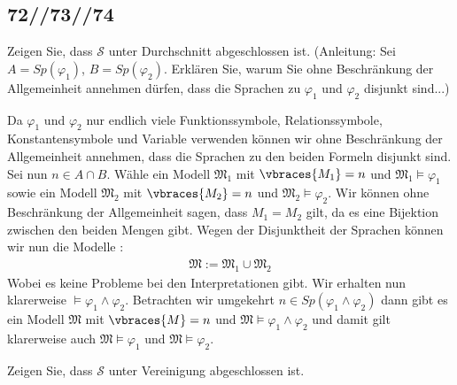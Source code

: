 \subsection*{72//73//74}

\begin{exercise}[72]

\phantom{}
	Zeigen Sie, dass $\mathscr{S}$ unter Durchschnitt abgeschlossen ist. (Anleitung: Sei $A = Sp(\varphi_1)$, $B = Sp(\varphi_2)$. Erklären Sie, warum Sie ohne Beschränkung der Allgemeinheit annehmen dürfen, dass die Sprachen zu $\varphi_1$ und $\varphi_2$ disjunkt sind...)

\end{exercise}


\begin{solution}

\phantom{}
	Da $\varphi_1$ und $\varphi_2$ nur endlich viele Funktionssymbole, Relationssymbole, Konstantensymbole und Variable verwenden können wir ohne Beschränkung der Allgemeinheit annehmen, dass die Sprachen zu den beiden Formeln disjunkt sind.\newline
	Sei nun $n \in A \cap B$. Wähle ein Modell $\mathfrak{M}_1$ mit $\vbraces{M_1} = n$ und $\mathfrak{M}_1 \vDash \varphi_1$ sowie ein Modell $\mathfrak{M}_2$ mit $\vbraces{M_2} = n$ und $\mathfrak{M}_2 \vDash \varphi_2$. Wir können ohne Beschränkung der Allgemeinheit sagen, dass $M_1 = M_2$ gilt, da es eine Bijektion zwischen den beiden Mengen gibt. Wegen der Disjunktheit der Sprachen können wir nun die Modelle : 
	\begin{align*}
	\mathfrak{M} := \mathfrak{M}_1 \cup \mathfrak{M}_2
	\end{align*}
	Wobei es keine Probleme bei den Interpretationen gibt. Wir erhalten nun klarerweise $\mathfrak \vDash \varphi_1 \land \varphi_2$.  \newline
	Betrachten wir umgekehrt $n \in Sp(\varphi_1 \land \varphi_2)$ dann gibt es ein Modell $\mathfrak{M}$ mit $\vbraces{M} = n$ und $\mathfrak{M} \vDash \varphi_1 \land \varphi_2$ und damit gilt klarerweise auch $\mathfrak{M} \vDash \varphi_1$ und $\mathfrak{M} \vDash \varphi_2$. 
\end{solution}

\begin{exercise}[73]

\phantom{}
	Zeigen Sie, dass $\mathscr{S}$ unter Vereinigung abgeschlossen ist.

\end{exercise}

